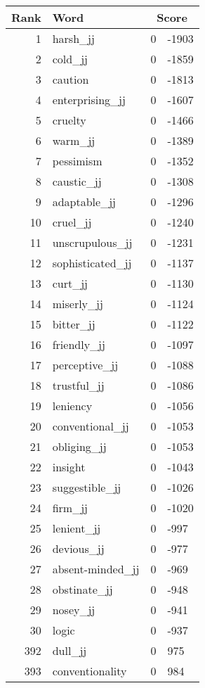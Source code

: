 \begin{longtable}[!htbp]{| rlr@{.}l |}
    \hline
    \textbf{Rank} & \textbf{Word} & \multicolumn{2}{c|}{\textbf{Score}} \\
    \hline
    \endhead
    1 & harsh\_jj & 0 & -1903 \\
    2 & cold\_jj & 0 & -1859 \\
    3 & caution & 0 & -1813 \\
    4 & enterprising\_jj & 0 & -1607 \\
    5 & cruelty & 0 & -1466 \\
    6 & warm\_jj & 0 & -1389 \\
    7 & pessimism & 0 & -1352 \\
    8 & caustic\_jj & 0 & -1308 \\
    9 & adaptable\_jj & 0 & -1296 \\
    10 & cruel\_jj & 0 & -1240 \\
    11 & unscrupulous\_jj & 0 & -1231 \\
    12 & sophisticated\_jj & 0 & -1137 \\
    13 & curt\_jj & 0 & -1130 \\
    14 & miserly\_jj & 0 & -1124 \\
    15 & bitter\_jj & 0 & -1122 \\
    16 & friendly\_jj & 0 & -1097 \\
    17 & perceptive\_jj & 0 & -1088 \\
    18 & trustful\_jj & 0 & -1086 \\
    19 & leniency & 0 & -1056 \\
    20 & conventional\_jj & 0 & -1053 \\
    21 & obliging\_jj & 0 & -1053 \\
    22 & insight & 0 & -1043 \\
    23 & suggestible\_jj & 0 & -1026 \\
    24 & firm\_jj & 0 & -1020 \\
    25 & lenient\_jj & 0 & -997 \\
    26 & devious\_jj & 0 & -977 \\
    27 & absent-minded\_jj & 0 & -969 \\
    28 & obstinate\_jj & 0 & -948 \\
    29 & nosey\_jj & 0 & -941 \\
    30 & logic & 0 & -937 \\
    392 & dull\_jj & 0 & 975 \\
    393 & conventionality & 0 & 984 \\

\end{longtable}

